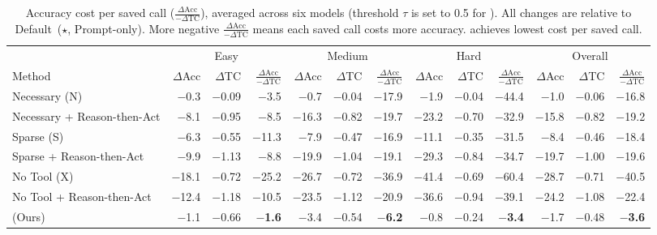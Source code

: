 \begin{table}[h]
\caption{Accuracy cost per saved call ($\frac{\Delta\text{Acc}}{-\Delta\text{TC}}$), averaged across six models (threshold $\tau$ is set to 0.5 for \method{}). All changes are relative to Default~($\star$, Prompt-only). More negative $\frac{\Delta\text{Acc}}{-\Delta\text{TC}}$ means each saved call costs more accuracy. \method{} achieves lowest cost per saved call.}
\vspace{-5pt}
\label{tab:adaptive_reduction}
\centering
\footnotesize
\setlength{\tabcolsep}{1.8pt}
\begin{tabular}{l rrr rrr rrr rrr}
\toprule
& \multicolumn{3}{c}{Easy} & \multicolumn{3}{c}{Medium} & \multicolumn{3}{c}{Hard} & \multicolumn{3}{c}{Overall} \\
\cmidrule(lr){2-4} \cmidrule(lr){5-7} \cmidrule(lr){8-10} \cmidrule(lr){11-13}
Method & $\Delta$Acc & $\Delta$TC & $\frac{\Delta\text{Acc}}{-\Delta\text{TC}}$ & $\Delta$Acc & $\Delta$TC & $\frac{\Delta\text{Acc}}{-\Delta\text{TC}}$ & $\Delta$Acc & $\Delta$TC & $\frac{\Delta\text{Acc}}{-\Delta\text{TC}}$ & $\Delta$Acc & $\Delta$TC & $\frac{\Delta\text{Acc}}{-\Delta\text{TC}}$ \\
\midrule
Necessary (N)     & $-$0.3  & $-$0.09 & $-$3.5  & $-$0.7  & $-$0.04 & $-$17.9 & $-$1.9  & $-$0.04 & $-$44.4 & $-$1.0  & $-$0.06 & $-$16.8 \\
Necessary + Reason-then-Act & $-$8.1  & $-$0.95 & $-$8.5  & $-$16.3 & $-$0.82 & $-$19.7 & $-$23.2 & $-$0.70 & $-$32.9 & $-$15.8 & $-$0.82 & $-$19.2 \\
Sparse (S)        & $-$6.3  & $-$0.55 & $-$11.3 & $-$7.9  & $-$0.47 & $-$16.9 & $-$11.1 & $-$0.35 & $-$31.5 & $-$8.4  & $-$0.46 & $-$18.4 \\
Sparse + Reason-then-Act    & $-$9.9  & $-$1.13 & $-$8.8  & $-$19.9 & $-$1.04 & $-$19.1 & $-$29.3 & $-$0.84 & $-$34.7 & $-$19.7 & $-$1.00 & $-$19.6 \\
No Tool (X)       & $-$18.1 & $-$0.72 & $-$25.2 & $-$26.7 & $-$0.72 & $-$36.9 & $-$41.4 & $-$0.69 & $-$60.4 & $-$28.7 & $-$0.71 & $-$40.5 \\
No Tool + Reason-then-Act   & $-$12.4 & $-$1.18 & $-$10.5 & $-$23.5 & $-$1.12 & $-$20.9 & $-$36.6 & $-$0.94 & $-$39.1 & $-$24.2 & $-$1.08 & $-$22.4 \\
\midrule
\method{}  (Ours)        & $-$1.1  & $-$0.66 & \textbf{$-$1.6}  & $-$3.4  & $-$0.54 & \textbf{$-$6.2}  & $-$0.8  & $-$0.24 & \textbf{$-$3.4}  & $-$1.7  & $-$0.48 & \textbf{$-$3.6} \\
\bottomrule
\end{tabular}
\end{table}

